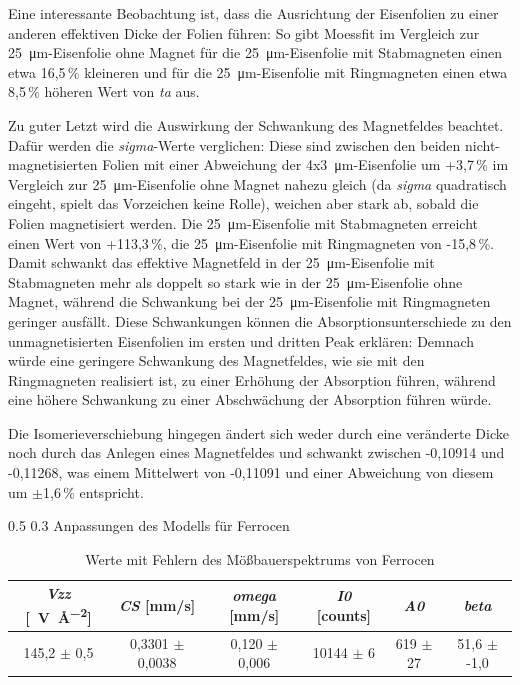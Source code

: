 \documentclass[german, %
parskip=full, %
bibliography=totoc, %
]{scrartcl}
\makeatletter
\renewcommand\subsection{\@startsection 
   {subsection}{2}{0mm}%
   {0.5\baselineskip}%
   {0.3\baselineskip}%
   {\bfseries\sffamily\large}%
   }
\makeatother
\begin{document}
Eine interessante Beobachtung ist, dass die Ausrichtung der Eisenfolien zu einer anderen effektiven Dicke der Folien führen: So gibt Moessfit im Vergleich zur \SI{25}{\micro\meter}-Eisenfolie ohne Magnet für die \SI{25}{\micro\meter}-Eisenfolie mit Stabmagneten einen etwa 16,5\,\% kleineren und für die \SI{25}{\micro\meter}-Eisenfolie mit Ringmagneten einen etwa 8,5\,\% höheren Wert von \textit{ta} aus.

Zu guter Letzt wird die Auswirkung der Schwankung des Magnetfeldes beachtet. Dafür werden die \textit{sigma}-Werte verglichen: Diese sind zwischen den beiden nicht-magnetisierten Folien mit einer Abweichung der 4x\SI{3}{\micro\meter}-Eisenfolie um +3,7\,\% im Vergleich zur \SI{25}{\micro\meter}-Eisenfolie ohne Magnet nahezu gleich (da \textit{sigma} quadratisch eingeht, spielt das Vorzeichen keine Rolle), weichen aber stark ab, sobald die Folien magnetisiert werden. Die \SI{25}{\micro\meter}-Eisenfolie mit Stabmagneten erreicht einen Wert von +113,3\,\%, die \SI{25}{\micro\meter}-Eisenfolie mit Ringmagneten von -15,8\,\%. Damit schwankt das effektive Magnetfeld in der \SI{25}{\micro\meter}-Eisenfolie mit Stabmagneten mehr als doppelt so stark wie in der \SI{25}{\micro\meter}-Eisenfolie ohne Magnet, während die Schwankung bei der \SI{25}{\micro\meter}-Eisenfolie mit Ringmagneten geringer ausfällt. Diese Schwankungen können die Absorptionsunterschiede zu den unmagnetisierten Eisenfolien im ersten und dritten Peak erklären: Demnach würde eine geringere Schwankung des Magnetfeldes, wie sie mit den Ringmagneten realisiert ist, zu einer Erhöhung der Absorption führen, während eine höhere Schwankung zu einer Abschwächung der Absorption führen würde.

Die Isomerieverschiebung hingegen ändert sich weder durch eine veränderte Dicke noch durch das Anlegen eines Magnetfeldes und schwankt zwischen -0,10914 und -0,11268, was einem Mittelwert von -0,11091 und einer Abweichung von diesem um $\pm$1,6\,\% entspricht. 

\subsection{Anpassungen des Modells für Ferrocen}

\begin{table}[ht]
\centering
\begin{tabular}[h]{c|c|c|c|c|c}
\textit{Vzz} [\SI{}{\volt\per\square\angstrom}] & \textit{CS} [mm/s] & \textit{omega} [mm/s] & \textit{I0} [counts] & \textit{A0} & \textit{beta} \\ \hline
145,2 $\pm$ 0,5 & 0,3301 $\pm$ 0,0038 & 0,120 $\pm$ 0,006 & 10144 $\pm$ 6 & 619 $\pm$ 27 & 51,6 $\pm$ -1,0
\end{tabular}
\caption{Werte mit Fehlern des Mößbauerspektrums von Ferrocen}
\label{tab:werteferrocen}
\end{table}
\end{document}
